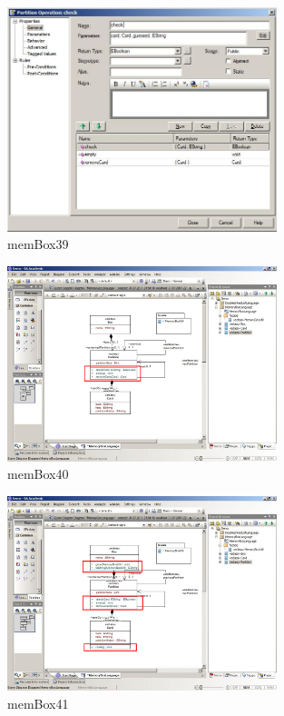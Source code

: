 \begin{figure}[htbp]
	\centering
  \includegraphics[width=0.7\textwidth]{pics/memBox39.png}
	\caption{memBox39}
	\label{memBox39}
\end{figure}

\begin{figure}[htbp]
	\centering
  \includegraphics[width=0.7\textwidth]{pics/memBox40.png}
	\caption{memBox40}
	\label{memBox40}
\end{figure}

\begin{figure}[htbp]
	\centering
  \includegraphics[width=0.7\textwidth]{pics/memBox41.png}
	\caption{memBox41}
	\label{memBox41}
\end{figure}

